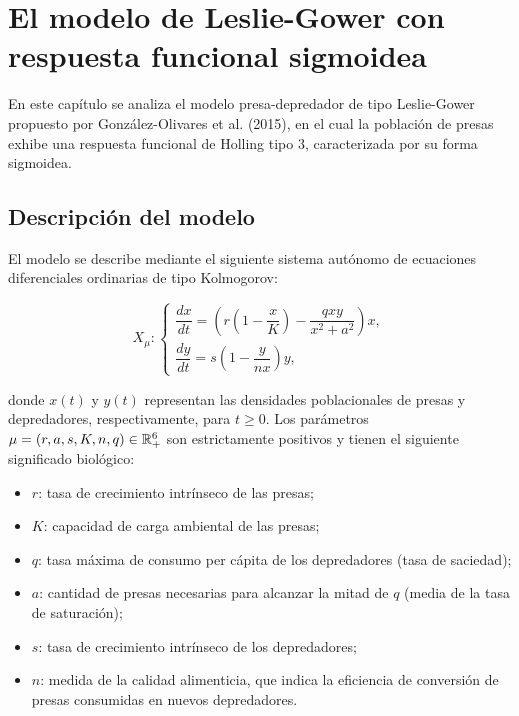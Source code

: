 \chapter[Modelo de Leslie-Gower]{El modelo de Leslie-Gower con respuesta funcional sigmoidea}

En este capítulo se analiza el modelo presa-depredador de tipo Leslie-Gower propuesto por González-Olivares et al. (2015)\cite{articulo}, en el cual la población de presas exhibe una respuesta funcional de Holling tipo 3, caracterizada por su forma sigmoidea.

\section{Descripción del modelo}

El modelo se describe mediante el siguiente sistema autónomo de ecuaciones diferenciales ordinarias de tipo Kolmogorov:

\begin{equation}
	X_{\mu}:
	\begin{cases}
		\dfrac{dx}{dt} = \left(r \left(1 - \dfrac{x}{K}\right) - \dfrac{q x y}{x^2 + a^2}\right) x, \\
		\dfrac{dy}{dt} = s \left(1 - \dfrac{y}{n x}\right) y,
	\end{cases}
	\label{eq:modelo1}
\end{equation}

\noindent donde $x(t)$ y $y(t)$ representan las densidades poblacionales de presas y depredadores, respectivamente, para $t \geq 0$. Los parámetros $\mu = (r, a, s, K, n, q) \in {\mathbb{R}}^6_{+}$ son estrictamente positivos y tienen el siguiente significado biológico:

\begin{itemize}
	\item $r$: tasa de crecimiento intrínseco de las presas;
	\item $K$: capacidad de carga ambiental de las presas;
	\item $q$: tasa máxima de consumo per cápita de los depredadores (tasa de saciedad);
	\item $a$: cantidad de presas necesarias para alcanzar la mitad de $q$ (media de la tasa de saturación);
	\item $s$: tasa de crecimiento intrínseco de los depredadores;
	\item $n$: medida de la calidad alimenticia, que indica la eficiencia de conversión de presas consumidas en nuevos depredadores.
\end{itemize}

